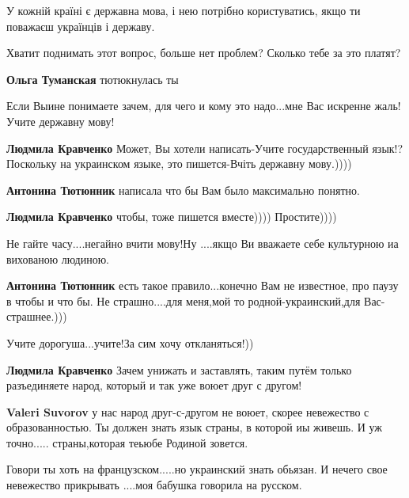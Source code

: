 \begin{itemize}
{
У кожній країні є державна мова, і нею потрібно користуватись, якщо ти поважаєш
українців і державу.

Хватит поднимать этот вопрос, больше нет проблем? Сколько тебе за это платят?

\textbf{Ольга Туманская} тютюкнулась ты


Если Выине понимаете зачем, для чего и кому это надо...мне Вас искренне
жаль!Учите державну мову!

\begin{itemize}


\textbf{Людмила Кравченко} Может, Вы хотели написать-Учите государственный
язык!? Поскольку на украинском языке, это пишется-Вчіть державну мову.))))

\textbf{Антонина Тютюнник} написала что бы Вам было максимально понятно.

\textbf{Людмила Кравченко} чтобы, тоже пишется вместе)))) Простите))))

Не гайте часу....негайно вчити мову!Ну ....якщо Ви вважаете себе культурною иа вихованою людиною.

\textbf{Антонина Тютюнник} есть такое правило...конечно Вам не известное, про
паузу в чтобы и что бы. Не страшно....для меня,мой то родной-украинский,для
Вас-страшнее.)))

Учите дорогуша...учите!За сим хочу откланяться!))

\textbf{Людмила Кравченко} Зачем унижать и заставлять,
таким путём только разъединяете народ, который и так уже воюет друг с другом!


\textbf{Valeri Suvorov} у нас народ друг-с-другом не воюет, скорее невежество с
образованностью. Ты должен знать язык страны, в которой иы живешь. И уж
точно..... страны,которая теьюбе Родиной зовется.


Говори ты хоть на французском.....но украинский знать обьязан. И нечего свое
невежество прикрывать ....моя бабушка говорила на русском.



\end{itemize}}
\end{itemize}
